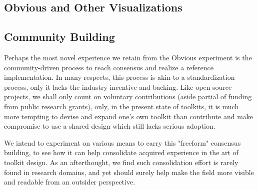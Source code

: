 \subsection{Obvious and Other Visualizations}


\subsection{Community Building}

Perhaps the most novel experience we retain from the Obvious experiment is the community-driven process to reach consensus and realize a reference implementation. 
In many respects, this process is akin to a standardization process, only it lacks the industry incentive and backing. Like open source projects, we shall only count on voluntary contributions (aside partial of funding from public research grants), only, in the present state of toolkits, it is much more tempting to devise and expand one's own toolkit than contribute and make compromise to use a shared design which still lacks serious adoption.

We intend to experiment on various means to carry this "freeform" consensus building, to see how it can help consolidate acquired experience in the art of toolkit design. As an afterthought, we find such consolidation effort is rarely found in research domains, and yet should surely help make the field more visible and readable from an outsider perspective.
